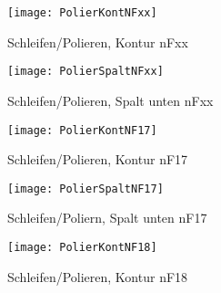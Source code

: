 \documentclass[12pt,a4paper,parskip]{scrartcl}
\begin{document}
\begin{figure}[H]
\centering
\texttt{[image: PolierKontNFxx]}
\caption{Schleifen/Polieren, Kontur nFxx}
\end{figure}
\begin{figure}[H]
\centering
\texttt{[image: PolierSpaltNFxx]}
\caption{Schleifen/Polieren, Spalt unten nFxx}
\end{figure}
\begin{figure}[H]
\centering
\texttt{[image: PolierKontNF17]}
\caption{Schleifen/Polieren, Kontur nF17}
\end{figure}
\begin{figure}[H]
\centering
\texttt{[image: PolierSpaltNF17]}
\caption{Schleifen/Poliern, Spalt unten nF17}
\end{figure}
\begin{figure}[H]
\centering
\texttt{[image: PolierKontNF18]}
\caption{Schleifen/Polieren, Kontur nF18}
\end{figure}
\end{document}
